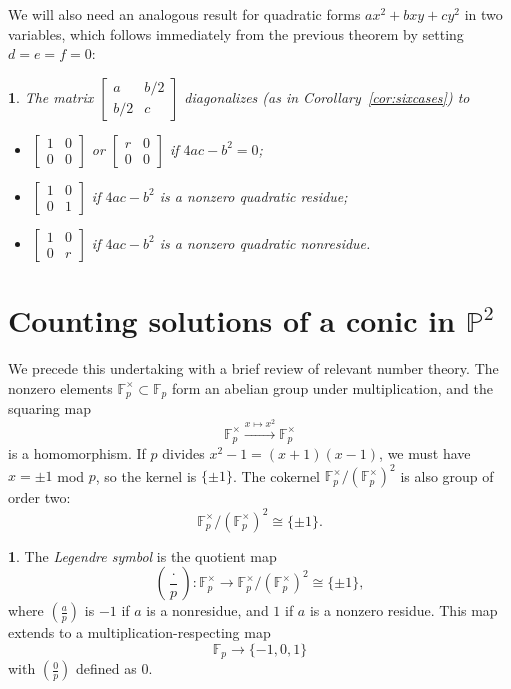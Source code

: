 \documentclass[10pt,a4paper]{amsart}
\numberwithin{equation}{section}
\numberwithin{figure}{section}
\theoremstyle{definition}
\theoremstyle{remark}
\theoremstyle{plain}
\theoremstyle{plain}
\newtheorem{cor}{\protect\corollaryname}[section]
\theoremstyle{definition}
\newtheorem{defn}{\protect\definitionname}[section]
\theoremstyle{plain}
\theoremstyle{plain}
\providecommand{\definitionname}{Definition}
\providecommand{\corollaryname}{Corollary}
\newcommand{\legendre}[2]{\genfrac{(}{)}{}{}{#1}{#2}}
\renewcommand{\P}{\mathbb{P}}
\newcommand{\F}{\mathbb{F}}
\begin{document}
	We will also need an analogous result for quadratic forms $ax^2+bxy+cy^2$ in two variables, which follows immediately from the previous theorem by setting $d=e=f=0$:
	\begin{cor}
	The matrix $\left[\begin{smallmatrix}a&b/2\\b/2&c\end{smallmatrix}\right]$ diagonalizes (as in Corollary~\ref{cor:sixcases}) to
	\begin{itemize}
	\item $\left[\begin{smallmatrix}1&0\\0&0\end{smallmatrix}\right]$ or $\left[\begin{smallmatrix}r&0\\0&0\end{smallmatrix}\right]$ if $4ac-b^2=0$;
	\item $\left[\begin{smallmatrix}1&0\\0&1\end{smallmatrix}\right]$ if $4ac-b^2$ is a nonzero quadratic residue;
	\item $\left[\begin{smallmatrix}1&0\\0&r\end{smallmatrix}\right]$ if $4ac-b^2$ is a nonzero quadratic nonresidue.
	\end{itemize}
	\end{cor}

    \section{Counting solutions of a conic in $\P^2$}\label{sec:proj-solutions}

	We precede this undertaking with a brief review of relevant number theory.
	The nonzero elements $\F_p^\times \subset \F_p$ form an abelian
	group under multiplication, and the squaring map 
	\[ \F^\times_p \xrightarrow{x \mapsto x^2} \F^\times_p \] 
	is a homomorphism. If $p$ divides $x^2 - 1 = (x+1)(x-1)$, we must have 
	$x = \pm 1$ mod $p$, so the kernel is $\{\pm 1\}$. 
	The cokernel $\F_p^\times / (\F_p^\times)^2$ is also group of order two: 
	\[ \F_p^\times / (\F_p^\times)^2 \cong \{\pm 1\}.  \]
	\begin{defn}
		The \emph{Legendre symbol} is the quotient map    
		\[ \legendre{\cdot}{p}: 
		\F_p^\times \to \F_p^\times / (\F_p^\times)^2 \cong \{\pm 1\}, \]
		where $\legendre{a}{p}$ is $-1$ if $a$ is a nonresidue,
		and $1$ if $a$ is a nonzero residue. This map extends to a multiplication-respecting map
		\[ \F_p \to \{-1,0,1\} \]
		with $\legendre{0}{p}$ defined as $0$.
	\end{defn}
	
\end{document}
